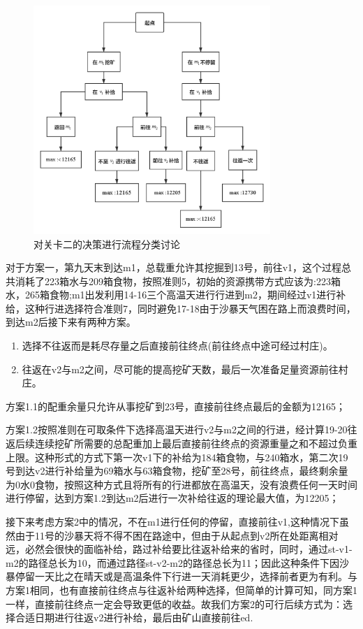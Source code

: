 \documentclass[a4paper]{ctexart}
\begin{document}
\begin{figure}[htpb]
    \centering
    \includegraphics[width=0.8\textwidth]{./pictures/flowchart.jpg}
    \caption{对关卡二的决策进行流程分类讨论}
    \label{fig:flowchart}
\end{figure}

对于方案一，第九天末到达m1，总载重允许其挖掘到13号，前往v1，这个过程总共消耗了223箱水与209箱食物，按照准则5，初始的资源携带方式应该为:223箱水，265箱食物;m1出发利用14-16三个高温天进行行进到m2，期间经过v1进行补给，这种行进选择符合准则7，同时避免17-18由于沙暴天气困在路上而浪费时间，到达m2后接下来有两种方案。


\begin{enumerate}
    \item 选择不往返而是耗尽存量之后直接前往终点(前往终点中途可经过村庄)。
    \item 往返在v2与m2之间，尽可能的提高挖矿天数，最后一次准备足量资源前往村庄。
\end{enumerate}

方案1.1的配重余量只允许从事挖矿到23号，直接前往终点最后的金额为12165；

方案1.2按照准则在可取条件下选择高温天进行v2与m2之间的行进，经计算19-20往返后续连续挖矿所需要的总配重加上最后直接前往终点的资源重量之和不超过负重上限。这种形式的方式下第一次v1下的补给为184箱食物，与240箱水，第二次19号到达v2进行补给量为69箱水与63箱食物，挖矿至28号，前往终点，最终剩余量为0水0食物，按照这种方式且将所有的行进都放在高温天，没有浪费任何一天时间进行停留，达到方案1.2到达m2后进行一次补给往返的理论最大值，为12205；

接下来考虑方案2中的情况，不在m1进行任何的停留，直接前往v1,这种情况下虽然由于11号的沙暴天将不得不困在路途中，但由于从起点到v2所在处距离相对远，必然会很快的面临补给，路过补给要比往返补给来的省时，同时，通过st-v1-m2的路径总长为10，而通过路径st-v2-m2的路径总长为11；因此这种条件下因沙暴停留一天比之在晴天或是高温条件下行进一天消耗更少，选择前者更为有利。与方案1相同，也有直接前往终点与往返补给两种选择，但简单的计算可知，同方案1一样，直接前往终点一定会导致更低的收益。故我们方案2的可行后续方式为：选择合适日期进行往返v2进行补给，最后由矿山直接前往ed.
\end{document}

